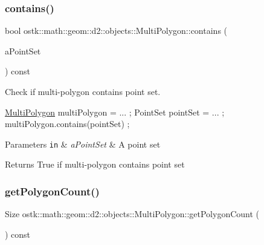 \subsubsection{\texorpdfstring{contains()}{contains()}\hspace{0.1cm}{\footnotesize\ttfamily [2/2]}}
{\footnotesize\ttfamily bool ostk\+::math\+::geom\+::d2\+::objects\+::\+Multi\+Polygon\+::contains (\begin{DoxyParamCaption}\item[{const \hyperlink{classostk_1_1math_1_1geom_1_1d2_1_1objects_1_1_point_set}{Point\+Set} \&}]{a\+Point\+Set }\end{DoxyParamCaption}) const}



Check if multi-\/polygon contains point set. 


\begin{DoxyCode}
\hyperlink{classostk_1_1math_1_1geom_1_1d2_1_1objects_1_1_multi_polygon_ad65532c9b323b5358cdcdd43da5ef9bd}{MultiPolygon} multiPolygon = ... ;
PointSet pointSet = ... ;
multiPolygon.contains(pointSet) ;
\end{DoxyCode}



\begin{DoxyParams}[1]{Parameters}
\mbox{\tt in}  & {\em a\+Point\+Set} & A point set \\
\hline
\end{DoxyParams}
\begin{DoxyReturn}{Returns}
True if multi-\/polygon contains point set 
\end{DoxyReturn}
\mbox{\label{classostk_1_1math_1_1geom_1_1d2_1_1objects_1_1_multi_polygon_a52386a4ee9cf5fa92cb42e9d4ba3fd93}} 
\subsubsection{\texorpdfstring{get\+Polygon\+Count()}{getPolygonCount()}}
{\footnotesize\ttfamily Size ostk\+::math\+::geom\+::d2\+::objects\+::\+Multi\+Polygon\+::get\+Polygon\+Count (\begin{DoxyParamCaption}{ }\end{DoxyParamCaption}) const}



